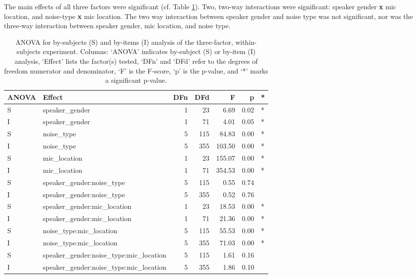 
The main effects of all three factors were significant (cf. Table \ref{tab:anova1}).  Two, two-way interactions were significant: speaker gender \textbf{x} mic location, and noise-type \textbf{x} mic location. The two way interaction between speaker gender and noise type was not significant, nor was the three-way interaction between speaker gender, mic location, and noise type.
  

\begin{table}[ht]
\centering
\begin{tabular}{llrrrrl}
  \hline
ANOVA & Effect & DFn & DFd & F & p & * \\ 
  \hline
S & speaker\_gender & 1 & 23 & 6.69 & 0.02 & * \\ 
  I & speaker\_gender & 1 & 71 & 4.01 & 0.05 & * \\ 
  S & noise\_type & 5 & 115 & 84.83 & 0.00 & * \\ 
  I & noise\_type & 5 & 355 & 103.50 & 0.00 & * \\ 
  S & mic\_location & 1 & 23 & 155.07 & 0.00 & * \\ 
  I & mic\_location & 1 & 71 & 354.53 & 0.00 & * \\ 
  S & speaker\_gender:noise\_type & 5 & 115 & 0.55 & 0.74 &  \\ 
  I & speaker\_gender:noise\_type & 5 & 355 & 0.52 & 0.76 &  \\ 
  S & speaker\_gender:mic\_location & 1 & 23 & 18.53 & 0.00 & * \\ 
  I & speaker\_gender:mic\_location & 1 & 71 & 21.36 & 0.00 & * \\ 
  S & noise\_type:mic\_location & 5 & 115 & 55.53 & 0.00 & * \\ 
  I & noise\_type:mic\_location & 5 & 355 & 71.03 & 0.00 & * \\ 
  S & speaker\_gender:noise\_type:mic\_location & 5 & 115 & 1.61 & 0.16 &  \\ 
  I & speaker\_gender:noise\_type:mic\_location & 5 & 355 & 1.86 & 0.10 &  \\ 
   \hline
\end{tabular}
\caption{ANOVA for by-subjects (S) and by-items (I) analysis of the three-factor, within-subjects experiment. Columns: `ANOVA' indicates by-subject (S) or by-item (I) analysis, `Effect' lists the factor(s) tested, `DFn' and `DFd' refer to the degrees of freedom numerator and denominator, `F' is the F-score, `p' is the p-value, and `*' marks a significant p-value.} 
\label{tab:anova1}
\end{table}



